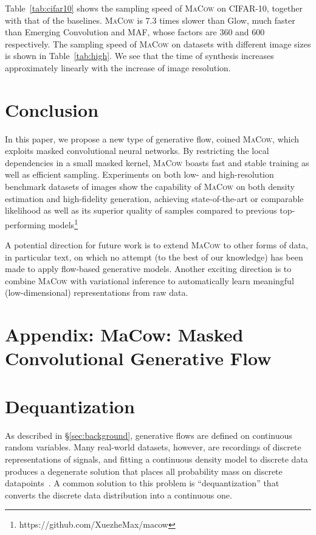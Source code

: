 \documentclass{article}
\begin{document}
Table~\ref{tab:cifar10} shows the sampling speed of \textsc{MaCow} on CIFAR-10, together with that of the baselines. 
\textsc{MaCow} is 7.3 times slower than Glow, much faster than Emerging Convolution and MAF, whose factors are 360 and 600 respectively.
The sampling speed of \textsc{MaCow} on datasets with different image sizes is shown in Table~\ref{tab:high}.
We see that the time of synthesis increases approximately linearly with the increase of image resolution.

\section{Conclusion}
In this paper, we propose a new type of generative flow, coined \textsc{MaCow}, which exploits masked convolutional neural networks.
By restricting the local dependencies in a small masked kernel, \textsc{MaCow} boasts fast and stable training as well as efficient sampling.
Experiments on both low- and high-resolution benchmark datasets of images show the capability of \textsc{MaCow} on both density estimation and high-fidelity generation, achieving state-of-the-art or comparable likelihood as well as its superior quality of samples compared to previous top-performing models\footnote{https://github.com/XuezheMax/macow}

A potential direction for future work is to extend \textsc{MaCow} to other forms of data, in particular text, on which no attempt (to the best of our knowledge) has been made to apply flow-based generative models.
Another exciting direction is to combine \textsc{MaCow} with variational inference to automatically learn meaningful (low-dimensional) representations from raw data.




\newpage
\section*{Appendix: MaCow: Masked Convolutional Generative Flow}
\appendix
\setcounter{equation}{0}

\section{Dequantization}\label{appendix:dequant}
As described in \S\ref{sec:background}, generative flows are defined on continuous random variables.
Many real-world datasets, however, are recordings of discrete representations of signals, and fitting a continuous density model to discrete data produces a degenerate solution that places all probability mass on discrete datapoints~\citep{uria2013rnade,ho2019flow++}.
A common solution to this problem is ``dequantization'' that converts the discrete data distribution into a continuous one.
\end{document}
